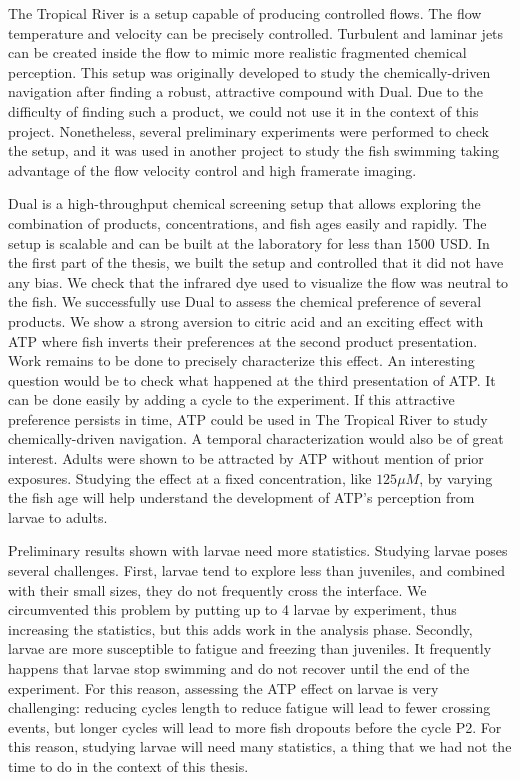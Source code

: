   The Tropical River is a setup capable of producing controlled flows. The flow temperature and velocity can be precisely controlled. Turbulent and laminar jets can be created inside the flow to mimic more realistic fragmented chemical perception. This setup was originally developed to study the chemically-driven navigation after finding a robust, attractive compound with Dual. Due to the difficulty of finding such a product, we could not use it in the context of this project. Nonetheless, several preliminary experiments were performed to check the setup, and it was used in another project to study the fish swimming taking advantage of the flow velocity control and high framerate imaging.

  Dual is a high-throughput chemical screening setup that allows exploring the combination of products, concentrations, and fish ages easily and rapidly. The setup is scalable and can be built at the laboratory for less than 1500 USD. In the first part of the thesis, we built the setup and controlled that it did not have any bias. We check that the infrared dye used to visualize the flow was neutral to the fish. We successfully use Dual to assess the chemical preference of several products. We show a strong aversion to citric acid and an exciting effect with ATP where fish inverts their preferences at the second product presentation. Work remains to be done to precisely characterize this effect. An interesting question would be to check what happened at the third presentation of ATP. It can be done easily by adding a cycle to the experiment. If this attractive preference persists in time, ATP could be used in The Tropical River to study chemically-driven navigation. A temporal characterization would also be of great interest. Adults were shown to be attracted by ATP without mention of prior exposures. Studying the effect at a fixed concentration, like $125 \mu M$, by varying the fish age will help understand the development of ATP's perception from larvae to adults.

  Preliminary results shown with larvae need more statistics. Studying larvae poses several challenges. First, larvae tend to explore less than juveniles, and combined with their small sizes, they do not frequently cross the interface. We circumvented this problem by putting up to 4 larvae by experiment, thus increasing the statistics, but this adds work in the analysis phase. Secondly, larvae are more susceptible to fatigue and freezing than juveniles. It frequently happens that larvae stop swimming and do not recover until the end of the experiment. For this reason, assessing the ATP effect on larvae is very challenging: reducing cycles length to reduce fatigue will lead to fewer crossing events, but longer cycles will lead to more fish dropouts before the cycle P2. For this reason, studying larvae will need many statistics, a thing that we had not the time to do in the context of this thesis.

